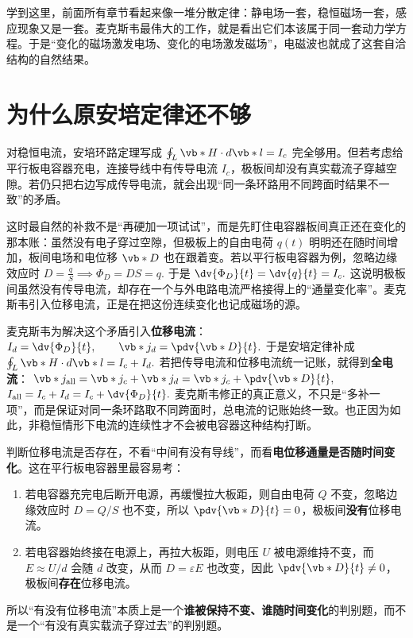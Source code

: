 \documentclass[lang=cn,11pt]{elegantbook}
\newcommand{\bridge}[1]{\begin{note}#1\end{note}}
\begin{document}
\bridge{学到这里，前面所有章节看起来像一堆分散定律：静电场一套，稳恒磁场一套，感应现象又是一套。麦克斯韦最伟大的工作，就是看出它们本该属于同一套动力学方程。于是“变化的磁场激发电场、变化的电场激发磁场”，电磁波也就成了这套自洽结构的自然结果。}

\section{为什么原安培定律还不够}

对稳恒电流，安培环路定理写成
 \(\oint_L \vb*{H}\cdot d\vb*{l}=I_c\) 
完全够用。但若考虑给平行板电容器充电，连接导线中有传导电流 \(I_c\)，极板间却没有真实载流子穿越空隙。若仍只把右边写成传导电流，就会出现“同一条环路用不同跨面时结果不一致”的矛盾。

这时最自然的补救不是“再硬加一项试试”，而是先盯住电容器板间真正还在变化的那本账：虽然没有电子穿过空隙，但极板上的自由电荷 \(q(t)\) 明明还在随时间增加，板间电场和电位移 \(\vb*{D}\) 也在跟着变。若以平行板电容器为例，忽略边缘效应时
 \(D=\frac{q}{S} \implies \Phi_D=DS=q.\) 
于是
 \(\dv{\Phi_D}{t}=\dv{q}{t}=I_c.\) 
这说明极板间虽然没有传导电流，却存在一个与外电路电流严格接得上的“通量变化率”。麦克斯韦引入位移电流，正是在把这份连续变化也记成磁场的源。

麦克斯韦为解决这个矛盾引入\textbf{位移电流}：
 \(I_d=\dv{\Phi_D}{t}, \qquad \vb*{j}_d=\pdv{\vb*{D}}{t}.\) 
于是安培定律补成
 \(\oint_L \vb*{H}\cdot d\vb*{l}=I_c+I_d.\) 
若把传导电流和位移电流统一记账，就得到\textbf{全电流}：
 \(\vb*{j}_{\mathrm{all}}=\vb*{j}_c+\vb*{j}_d =\vb*{j}_c+\pdv{\vb*{D}}{t},\) 
 \(I_{\mathrm{all}}=I_c+I_d =I_c+\dv{\Phi_D}{t}.\) 
麦克斯韦修正的真正意义，不只是“多补一项”，而是保证对同一条环路取不同跨面时，总电流的记账始终一致。也正因为如此，非稳恒情形下电流的连续性才不会被电容器这种结构打断。

\begin{note}
判断位移电流是否存在，不看“中间有没有导线”，而看\textbf{电位移通量是否随时间变化}。这在平行板电容器里最容易考：
\begin{enumerate}
 \item 若电容器充完电后断开电源，再缓慢拉大板距，则自由电荷 \(Q\) 不变，忽略边缘效应时 \(D=Q/S\) 也不变，所以 \(\pdv{\vb*{D}}{t}=0\)，极板间\textbf{没有}位移电流。
 \item 若电容器始终接在电源上，再拉大板距，则电压 \(U\) 被电源维持不变，而 \(E\approx U/d\) 会随 \(d\) 改变，从而 \(D=\varepsilon E\) 也改变，因此 \(\pdv{\vb*{D}}{t}\neq 0\)，极板间\textbf{存在}位移电流。
\end{enumerate}
所以“有没有位移电流”本质上是一个\textbf{谁被保持不变、谁随时间变化}的判别题，而不是一个“有没有真实载流子穿过去”的判别题。
\end{note}
\end{document}
